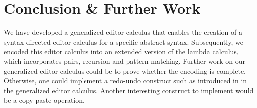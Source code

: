 \documentclass[sigplan,screen]{acmart}
\begin{document}
\section{Conclusion \& Further Work}
We have developed a generalized editor calculus that enables the creation of a syntax-directed editor calculus for a specific abstract syntax. Subsequently, we encoded this editor calculus into an extended version of the lambda calculus, which incorporates pairs, recursion and pattern matching.
Further work on our generalized editor calculus could be to prove whether the encoding is complete. Otherwise, one could implement a redo-undo construct such as introduced in \cite{undo_Edit} in the generalized editor calculus. Another interesting construct to implement would be a copy-paste operation.






\end{document}
